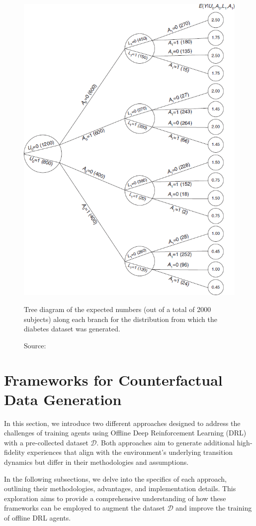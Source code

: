 \begin{figure}[h]
    \centering
    \includegraphics[width=.65\textwidth]{figures/ch4/diabetes2.png}
    \caption{Tree diagram of the expected numbers
    (out of a total of 2000 subjects) along each
    branch for the distribution from which the diabetes
    dataset was generated.}
    \vspace{-10px}
    \caption*{\scriptsize{Source: \cite{sim2012}}}
    \label{fig:diabetes2}
\end{figure}

\section{Frameworks for Counterfactual Data Generation}

In this section, we introduce two different approaches designed to
address the challenges of training agents using Offline
Deep Reinforcement Learning (DRL) with a pre-collected dataset \( \mathcal{D} \).
Both approaches aim to generate additional high-fidelity experiences
that align with the environment's underlying transition dynamics
but differ in their methodologies and assumptions.

In the following subsections, we delve into the specifics
of each approach, outlining their methodologies, advantages, and
implementation details. This exploration aims to
provide a comprehensive understanding of how these
frameworks can be employed to augment the dataset \( \mathcal{D} \) and improve
the training of offline DRL agents.


